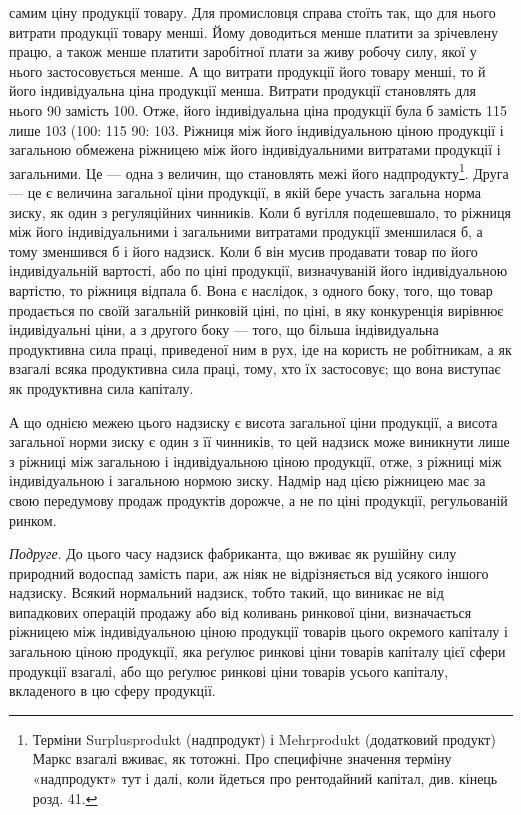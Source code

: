 \parcont{}  %
самим ціну продукції товару. Для промисловця справа стоїть так, що для нього
витрати продукції товару менші. Йому доводиться менше платити за зрічевлену
працю, а також менше платити заробітної плати за живу робочу силу, якої
у нього застосовується менше. А що витрати продукції його товару менші,
то й його індивідуальна ціна продукції менша. Витрати продукції становлять для
нього 90 замість 100. Отже, його індивідуальна ціна продукції була б замість
115 лише 103 (100: 115 \deq{} 90: 103. Ріжниця між його індивідуальною ціною
продукції і загальною обмежена ріжницею між його індивідуальними витратами
продукції і загальними. Це — одна з величин, що становлять межі його надпродукту\footnote{Терміни Surplusprodukt (надпродукт) і Mehrprodukt (додатковий продукт) Маркс взагалі вживає,
як тотожні. Про специфічне значення терміну «надпродукт» тут і далі, коли йдеться
про рентодайний капітал, див. кінець розд. 41. }. Друга — це є величина загальної ціни продукції, в якій бере участь
загальна норма зиску, як один з регуляційних чинників. Коли б вугілля подешевшало,
то ріжниця між його індивідуальними і загальними витратами продукції
зменшилася б, а тому зменшився б і його надзиск. Коли б він мусив продавати
товар по його індивідуальній вартості, або по ціні продукції, визначуваній
його індивідуальною вартістю, то ріжниця відпала б. Вона є наслідок, з одного
боку, того, що товар продається по своїй загальній ринковій ціні, по ціні,
в яку конкуренція вирівнює індивідуальні ціни, а з другого боку — того, що
більша індівидуальна продуктивна сила праці, приведеної ним в рух, іде на користь
не робітникам, а як взагалі всяка продуктивна сила праці, тому, хто їх
застосовує; що вона виступає як продуктивна сила капіталу.

А що однією межею цього надзиску є висота загальної ціни продукції,
а висота загальної норми зиску є один з її чинників, то цей надзиск може
виникнути лише з ріжниці між загальною і індивідуальною ціною продукції,
отже, з ріжниці між індивідуальною і загальною нормою зиску. Надмір над цією
ріжницею має за свою передумову продаж продуктів дорожче, а не по ціні
продукції, регульованій ринком.

\emph{Подруге}. До цього часу надзиск фабриканта, що вживає як рушійну силу
природний водоспад замість пари, аж ніяк не відрізняється від усякого іншого
надзиску. Всякий нормальний надзиск, тобто такий, що виникає не від випадкових
операцій продажу або від коливань ринкової ціни, визначається ріжницею між
індивідуальною ціною продукції товарів цього окремого капіталу і загальною
ціною продукції, яка реґулює ринкові ціни товарів капіталу цієї сфери продукції
взагалі, або що реґулює ринкові ціни товарів усього капіталу, вкладеного в цю
сферу продукції.

